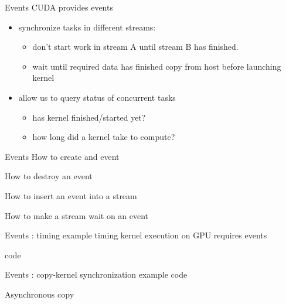 \begin{frame}[fragile]{Events}
    CUDA provides events
    \begin{itemize}
        \item synchronize tasks in different streams:
        \begin{itemize}
            \item don't start work in stream A until stream B has finished.
            \item wait until required data has finished copy from host before launching kernel
        \end{itemize}
        \item allow us to query status of concurrent tasks
        \begin{itemize}
            \item has kernel finished/started yet?
            \item how long did a kernel take to compute?
        \end{itemize}
    \end{itemize}
\end{frame}

\begin{frame}[fragile]{Events}
    How to create and event

    How to destroy an event

    How to insert an event into a stream

    How to make a stream wait on an event
\end{frame}

\begin{frame}[fragile]{Events : timing example}
    timing kernel execution on GPU requires events

    code
\end{frame}

\begin{frame}[fragile]{Events : copy-kernel synchronization example}
    code
\end{frame}

\begin{frame}[fragile]{Asynchronous copy}
\end{frame}

